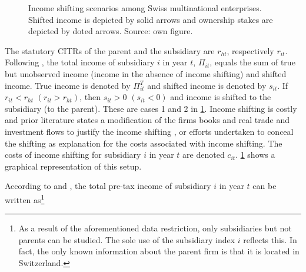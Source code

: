 \documentclass[10pt,twocolumn,oneside,cmyk]{article}
\begin{document}
\begin{figure}
 \centering \captionsetup{width=0.95\linewidth}
  \caption[Income shifting scenarios among Swiss multinational enterprises]{Income shifting scenarios among Swiss multinational enterprises. Shifted income is depicted by solid arrows and ownership stakes are depicted by doted arrows. Source: own figure.} \label{fig1}
\end{figure}

The statutory CITRs of the parent and the subsidiary are $r_{ht}$, respectively $r_{it}$. Following \textcite[159]{hines_fiscal_1994}, the total income of subsidiary $i$ in year $t$, $\Pi_{it}$, equals the sum of true but unobserved income (income in the absence of income shifting) and shifted income. True income is denoted by $\Pi_{it}^T$ and shifted income is denoted by $s_{it}$. If $r_{it}<r_{ht}$ $(r_{it}>r_{ht})$, then $s_{it}>0$ $(s_{it}<0)$ and income is shifted to the subsidiary (to the parent). These are cases 1 and 2 in \cref{fig1}. Income shifting is costly and prior literature states a modification of the firms books and real trade and investment flows to justify the income shifting \parencite[1166]{huizinga_international_2008}, or efforts undertaken to conceal the shifting \parencite[313]{haufler_corporate_2000} as explanation for the costs associated with income shifting. The costs of income shifting for subsidiary $i$ in year $t$ are denoted $c_{it}$. \cref{fig1} shows a graphical representation of this setup.

According to \textcite[159]{hines_fiscal_1994} and \textcite[1168-1169]{huizinga_international_2008}, the total pre-tax income of subsidiary $i$ in year $t$ can be written as\footnote{As a result of the aforementioned data restriction, only subsidiaries but not parents can be studied. The sole use of the subsidiary index $i$ reflects this. In fact, the only known information about the parent firm is that it is located in Switzerland.}
\end{document}
